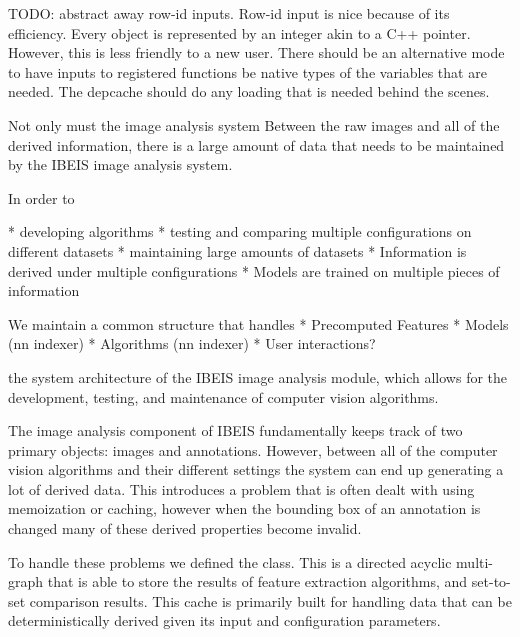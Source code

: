     TODO:{} abstract away row-id inputs.
    Row-id input is nice because of its efficiency.
    Every object is represented by an integer akin to a C++ pointer.
    However, this is less friendly to a new user.
    There should be an alternative mode to have inputs to registered
      functions be native types of the variables that are needed.
    The depcache should do any loading that is needed behind the
      scenes.



    Not only must the image analysis system Between the raw images and
      all of the derived information, there is a large amount of data
      that needs to be maintained by the IBEIS image analysis system.

    In order to 
    
    * developing algorithms
    * testing and comparing multiple configurations on different
    datasets
    * maintaining large amounts of datasets
    * Information is derived under multiple configurations
    * Models are trained on multiple pieces of information 

    
    We maintain a common structure that handles 
    * Precomputed Features
    * Models (nn indexer)
    * Algorithms (nn indexer)
    * User interactions?

    the system architecture of the IBEIS image
      analysis module, which allows for the development, testing, and
      maintenance of computer vision algorithms.

    The image analysis component of IBEIS fundamentally keeps track of
      two primary objects:
    images and annotations.
    However, between all of the computer vision algorithms and their
      different settings the system can end up generating a lot of
      derived data.
    This introduces a problem that is often dealt with using
      memoization or caching, however when the bounding box of an
      annotation is changed many of these derived properties become
      invalid.

    To handle these problems we defined the
      \glossterm{\DependencyCache{}} class.
    This is a directed acyclic multi-graph that is able to store the
      results of feature extraction algorithms, and set-to-set
      comparison results.
    This cache is primarily built for handling data that can be
      deterministically derived given its input and configuration
      parameters.

